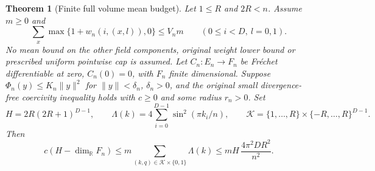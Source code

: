 \documentclass[11pt]{article}
\newtheorem{theorem}{Theorem}[section]
\newcommand{\R}{\mathbb R}
\begin{document}
\begin{theorem}[Finite full volume mean budget]\label{thm:volume-mean-finite}
Let $1\leq R$ and $2R<n$. Assume $m\geq0$ and
\begin{equation}\label{eq:total-positive-means}
 \sum_x\max\{1+w_n(i,(x,l)),0\}\leq V_n m
       \qquad(0\leq i<D,\ l=0,1).
\end{equation}
No mean bound on the other field components, original weight lower bound or
prescribed uniform pointwise cap is assumed. Let $C_n:E_n\to F_n$ be
Fr\'echet differentiable at zero, $C_n(0)=0$, with $F_n$ finite dimensional.
Suppose $\Phi_n(y)\leq K_n\|y\|^2$ for $\|y\|<\delta_n$, $\delta_n>0$,
and the original small divergence-free coercivity inequality holds with
$c\geq0$ and some radius $r_n>0$. Set
\[
 H=2R(2R+1)^{D-1},\qquad
 \Lambda(k)=4\sum_{i=0}^{D-1}\sin^2(\pi k_i/n),
 \qquad\mathcal K=\{1,\ldots,R\}\times\{-R,\ldots,R\}^{D-1}.
\]
Then
\begin{equation}\label{eq:volume-mean-finite}
 c(H-\dim_{\R}F_n)\leq m\sum_{(k,q)\in\mathcal K\times\{0,1\}}\Lambda(k)
 \leq mH\,\frac{4\pi^2 D R^2}{n^2}.
\end{equation}
\end{theorem}
\end{document}

